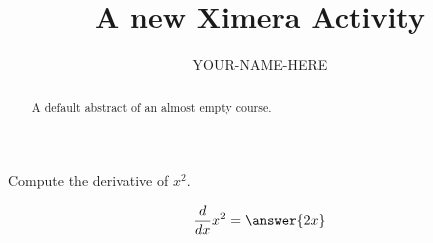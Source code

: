\documentclass{ximera}
\title{A new Ximera Activity}
\author{YOUR-NAME-HERE}
\begin{document}
\begin{abstract}
    A default abstract of an almost empty course.
\end{abstract}
\maketitle


\begin{exercise}
Compute the derivative of $x^2$.
\begin{prompt}
\[
\frac{d}{dx} x^2 = \answer{2x}
\]
\end{prompt}    
\end{exercise}
\end{document}
